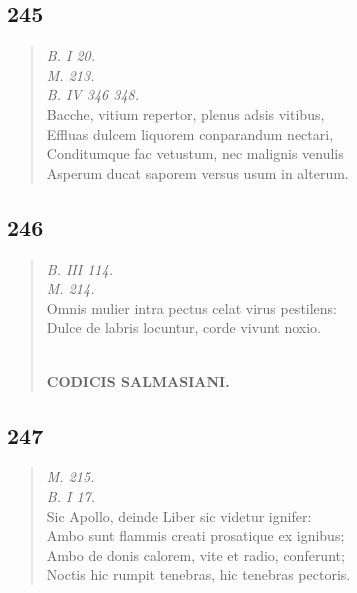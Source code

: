 \documentclass[11pt, a4paper]{report}
\begin{document}
            \subsection*{245}
      \begin{verse}
      \textit{B. I 20.} \\ \textit{M. 213.} \\ \textit{B. IV 346 348.} \\ Bacche, vitium repertor, plenus adsis vitibus, \\ Effluas dulcem liquorem conparandum nectari, \\ Conditumque fac vetustum, nec malignis venulis \\ Asperum ducat saporem versus usum in alterum. \\ 
      \end{verse}
  
            \subsection*{246}
      \begin{verse}
      \textit{B. III 114.} \\ \textit{M. 214.} \\ Omnis mulier intra pectus celat virus pestilens: \\ Dulce de labris locuntur, corde vivunt noxio. \\ 
        ﻿\pagebreak 
    \begin{center} \textbf{CODICIS SALMASIANI.} \end{center} \marginpar{[201]} 
      \end{verse}
  
            \subsection*{247}
      \begin{verse}
      \textit{M. 215.} \\ \textit{B. I 17.} \\ Sic Apollo, deinde Liber sic videtur ignifer: \\ Ambo sunt flammis creati prosatique ex ignibus; \\ Ambo de donis calorem, vite et radio, conferunt; \\ Noctis hic rumpit tenebras, hic tenebras pectoris. \\ 
      \end{verse}
  
\end{document}

